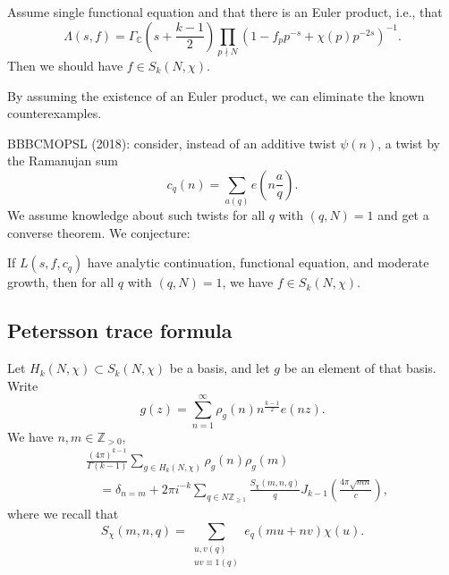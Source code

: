 \documentclass[reqno]{amsart} 
\begin{document}
\begin{conjecture}
  Assume single functional equation and that there is an Euler product, i.e., that
  \begin{equation*}
    \Lambda (s, f) = \Gamma_{\mathbb{C} } \left( s + \frac{k - 1}{2} \right)
    \prod_{p \nmid N}
    \left( 1 - f_p p^{- s } + \chi (p) p^{- 2 s } \right)^{-1}.
  \end{equation*}
  Then we should have $f \in S_k (N, \chi )$.
\end{conjecture}
\begin{remark}
  By assuming the existence of an Euler product, we can eliminate the known counterexamples.
\end{remark}

BBBCMOPSL (2018): consider, instead of an additive twist $\psi (n)$, a twist by the Ramanujan sum
\begin{equation*}
  c_q (n) = \sum_{a(q)} e \left( n \frac{a}{q} \right).
\end{equation*}
We assume knowledge about such twists for all $q$ with $(q, N) = 1$ and get a converse theorem.  We conjecture:
\begin{conjecture}
  If $L(s,f,c_q)$ have analytic continuation, functional equation, and moderate growth, then for all $q$ with $(q, N ) = 1$, we have $f \in S_k (N, \chi )$.
\end{conjecture}

\subsection{Petersson trace formula}
Let $H_k (N, \chi ) \subset S_k (N, \chi )$ be a basis, and let $g$ be an element of that basis.  Write
\begin{equation*}
  g (z) = \sum_{n = 1}^\infty \rho_g (n) n^{\frac{k - 1}{2}} e (n z).
\end{equation*}
We have $n, m \in \mathbb{Z}_{> 0}$,
\begin{align*}
  &\frac{(4 \pi )^{k - 1}}{ \Gamma (k - 1)}
    \sum_{g \in H_k (N, \chi )}
    \rho_g (n) \rho_g (m) \\
  &\quad = \delta_{n = m}
    +
    2 \pi i^{- k}
    \sum_{q \in N \mathbb{Z}_{\geq 1}}
    \frac{S_\chi (m, n, q)}{q}
    J_{k - 1 } \left( \frac{4 \pi \sqrt{m n}}{c} \right),
\end{align*}
where we recall that
\begin{equation*}
  S_\chi (m, n, q)
  = \sum_{
    \substack{
      u,v(q)  \\
       u v \equiv 1 (q)
    }
  }
  e_q (m u + n v) \chi (u).
\end{equation*}
\end{document}
